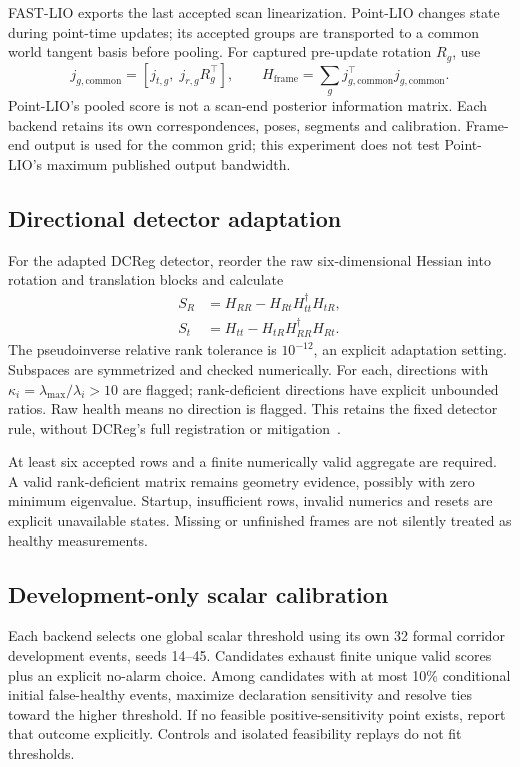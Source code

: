 \documentclass[11pt,a4paper]{article}
\begin{document}
FAST-LIO exports the last accepted scan linearization. Point-LIO changes
state during point-time updates; its accepted groups are transported to a
common world tangent basis before pooling. For captured pre-update rotation
$R_g$, use
\begin{equation}
j_{g,\mathrm{common}}=[j_{t,g},\;j_{r,g}R_g^\top],\qquad
H_{\mathrm{frame}}=\sum_g j_{g,\mathrm{common}}^\top j_{g,\mathrm{common}}.
\end{equation}
Point-LIO's pooled score is not a scan-end posterior information matrix.
Each backend retains its own correspondences, poses, segments and calibration.
Frame-end output is used for the common grid; this experiment does not test
Point-LIO's maximum published output bandwidth.

\subsection{Directional detector adaptation}
For the adapted DCReg detector, reorder the raw six-dimensional Hessian
into rotation and translation blocks and calculate
\begin{align}
S_R&=H_{RR}-H_{Rt}H_{tt}^{\dagger}H_{tR},\\
S_t&=H_{tt}-H_{tR}H_{RR}^{\dagger}H_{Rt}.
\end{align}
The pseudoinverse relative rank tolerance is $10^{-12}$, an explicit
adaptation setting. Subspaces are symmetrized and checked numerically.
For each, directions with $\kappa_i=\lambda_{\max}/\lambda_i>10$ are flagged;
rank-deficient directions have explicit unbounded ratios. Raw health means
no direction is flagged. This retains the fixed detector rule, without
DCReg's full registration or mitigation~\cite{dcreg}.

At least six accepted rows and a finite numerically valid aggregate are
required. A valid rank-deficient matrix remains geometry evidence, possibly
with zero minimum eigenvalue. Startup, insufficient rows, invalid numerics
and resets are explicit unavailable states. Missing or unfinished frames
are not silently treated as healthy measurements.

\subsection{Development-only scalar calibration}
Each backend selects one global scalar threshold using its own 32 formal
corridor development events, seeds 14--45. Candidates exhaust finite unique
valid scores plus an explicit no-alarm choice. Among candidates with at most
10\% conditional initial false-healthy events, maximize declaration sensitivity
and resolve ties toward the higher threshold. If no feasible positive-sensitivity
point exists, report that outcome explicitly. Controls and isolated feasibility
replays do not fit thresholds.
\end{document}

